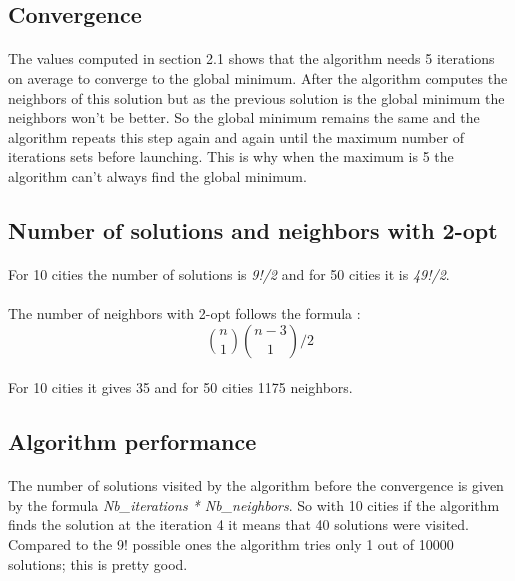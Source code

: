 \documentclass[12pt,oneside,a4paper]{article}
\begin{document}
\subsection{Convergence}
\paragraph{}
    The values computed in section 2.1 shows that the algorithm needs 5 iterations on average to converge to the
    global minimum. After the algorithm computes the neighbors of this solution but as the previous solution is the
    global minimum the neighbors won't be better. So the global minimum remains the same and the algorithm repeats this step
    again and again until the maximum number of iterations sets before launching. This is why when the maximum is 5 the
    algorithm can't always find the global minimum.

\subsection{Number of solutions and neighbors with 2-opt}
\paragraph{}
    For 10 cities the number of solutions is \textit{9!/2} and for 50 cities it is \textit{49!/2}.
\paragraph{}
    The number of neighbors with 2-opt follows the formula :
    \[\binom{n}{1}\binom{n-3}{1}/2\]
\paragraph{}
    For 10 cities it gives 35 and for 50 cities 1175 neighbors.

\subsection{Algorithm performance}
\paragraph{}
    The number of solutions visited by the algorithm before the convergence is given by the formula
    \textit{Nb\_iterations * Nb\_neighbors}. So with 10 cities if the algorithm finds the solution at the 
    iteration 4 it means that 40 solutions were visited. Compared to the 9! possible ones the algorithm tries only 1
    out of 10000 solutions; this is pretty good.
\newpage
\end{document}
